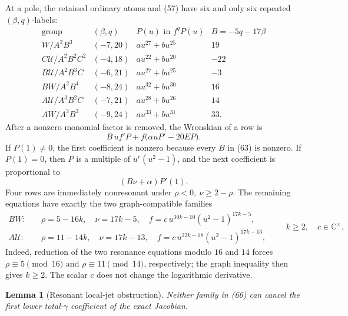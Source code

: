 \documentclass[11pt]{article}
\newtheorem{lemma}[theorem]{Lemma}
\theoremstyle{remark}
\newcommand{\C}{\mathbb C}
\newcommand{\cU}{\mathcal U}
\begin{document}
At a pole, the retained ordinary atoms and (57) have six and only six
repeated \((\beta,q)\)-labels:
\[
\begin{array}{c|c|c|c}
\text{group}&(\beta,q)&P(u)\text{ in }f^qP(u)&
B=-5q-17\beta\\ \hline
W/A^2B^3&(-7,20)&a u^{27}+b u^{25}&19\\
C\cU/A^2B^2C^2&(-4,18)&a u^{22}+b u^{20}&-22\\
B\cU/A^2B^3C&(-6,21)&a u^{27}+b u^{25}&-3\\
BW/A^2B^4&(-8,24)&a u^{32}+b u^{30}&16\\
A\cU/A^3B^2C&(-7,21)&a u^{28}+b u^{26}&14\\
AW/A^3B^3&(-9,24)&a u^{33}+b u^{31}&33.
\end{array}
\tag{63}
\]
After a nonzero monomial factor is removed, the Wronskian of a row is
\[
B\,u f'P+f\bigl(\alpha uP'-20EP\bigr).
\tag{64}
\]
If \(P(1)\ne0\), the first coefficient is nonzero because every \(B\)
in (63) is nonzero.  If \(P(1)=0\), then
\(P\) is a multiple of \(u^r(u^2-1)\), and the next coefficient is
proportional to
\[
(B\nu+\alpha)P'(1).
\tag{65}
\]
Four rows are immediately nonresonant under
\(\rho<0,\ \nu\ge2-\rho\).  The remaining equations have exactly the
two graph-compatible families
\[
\begin{aligned}
BW:\quad&
\rho=5-16k,\quad \nu=17k-5,\quad
f=c\,u^{30k-10}(u^2-1)^{17k-5},\\
A\cU:\quad&
\rho=11-14k,\quad \nu=17k-13,\quad
f=c\,u^{22k-18}(u^2-1)^{17k-13},
\end{aligned}
\qquad k\ge2,\quad c\in\C^\times.
\tag{66}
\]
Indeed, reduction of the two resonance equations modulo \(16\) and
\(14\) forces \(\rho\equiv5\pmod {16}\) and
\(\rho\equiv11\pmod {14}\), respectively; the graph inequality then
gives \(k\ge2\).  The scalar \(c\) does not change the logarithmic
derivative.

\begin{lemma}[Resonant local-jet obstruction]
\label{lem:resonant-eleven}
Neither family in (66) can cancel the first lower total-\(\gamma\)
coefficient of the exact Jacobian.
\end{lemma}
\end{document}
